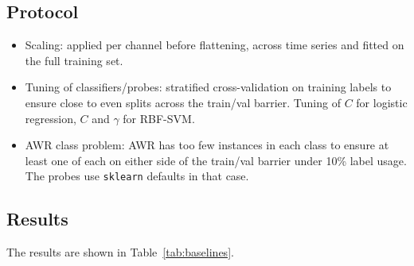 \documentclass[a4paper,11pt]{article}
\newcommand{\code}[1]{\texttt{#1}}
\begin{document}
\subsection{Protocol}
\begin{itemize}
    \item Scaling: applied per channel before flattening, across time series and fitted on the full training set.
    \item Tuning of classifiers/probes: stratified cross-validation on training labels to ensure close to even splits across the train/val barrier. Tuning of $C$ for logistic regression, $C$ and $\gamma$ for RBF-SVM.
    \item AWR class problem: AWR has too few instances in each class to ensure at least one of each on either side of the train/val barrier under 10\% label usage. The probes use \code{sklearn} defaults in that case.
\end{itemize}

\subsection{Results}
The results are shown in Table~\ref{tab:baselines}.
\end{document}
